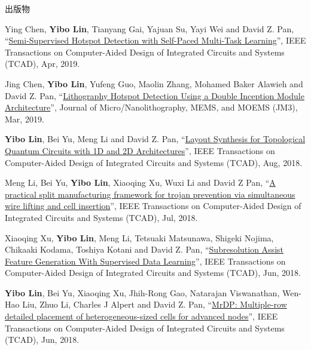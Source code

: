 \begin{rSection}{出版物}
\begin{description}[font=\normalfont, rightmargin=2em]
{}
            

\item[{[J14]}]{
        Ying Chen, \textbf{Yibo Lin}, Tianyang Gai, Yajuan Su, Yayi Wei and David Z. Pan, 
    ``\href{https://doi.org/10.1109/TCAD.2019.2912948}{Semi-Supervised Hotspot Detection with Self-Paced Multi-Task Learning}'', 
    IEEE Transactions on Computer-Aided Design of Integrated Circuits and Systems (TCAD), Apr, 2019.
    
}
            

\item[{[J13]}]{
        Jing Chen, \textbf{Yibo Lin}, Yufeng Guo, Maolin Zhang, Mohamed Baker Alawieh and David Z. Pan, 
    ``\href{https://doi.org/10.1117/1.JMM.18.1.013507}{Lithography Hotspot Detection Using a Double Inception Module Architecture}'', 
    Journal of Micro/Nanolithography, MEMS, and MOEMS (JM3), Mar, 2019.
    
}
            

\item[{[J12]}]{
        \textbf{Yibo Lin}, Bei Yu, Meng Li and David Z. Pan, 
    ``\href{https://doi.org/10.1109/TCAD.2017.2760511}{Layout Synthesis for Topological Quantum Circuits with 1D and 2D Architectures}'', 
    IEEE Transactions on Computer-Aided Design of Integrated Circuits and Systems (TCAD), Aug, 2018.
    
}
            

\item[{[J11]}]{
        Meng Li, Bei Yu, \textbf{Yibo Lin}, Xiaoqing Xu, Wuxi Li and David Z Pan, 
    ``\href{https://doi.org/10.1109/TCAD.2018.2859402}{A practical split manufacturing framework for trojan prevention via simultaneous wire lifting and cell insertion}'', 
    IEEE Transactions on Computer-Aided Design of Integrated Circuits and Systems (TCAD), Jul, 2018.
    
}
            

\item[{[J10]}]{
        Xiaoqing Xu, \textbf{Yibo Lin}, Meng Li, Tetsuaki Matsunawa, Shigeki Nojima, Chikaaki Kodama, Toshiya Kotani and David Z. Pan, 
    ``\href{https://doi.org/10.1109/TCAD.2017.2748029}{Subresolution Assist Feature Generation With Supervised Data Learning}'', 
    IEEE Transactions on Computer-Aided Design of Integrated Circuits and Systems (TCAD), Jun, 2018.
    
}
            

\item[{[J9]}]{
        \textbf{Yibo Lin}, Bei Yu, Xiaoqing Xu, Jhih-Rong Gao, Natarajan Viswanathan, Wen-Hao Liu, Zhuo Li, Charles J Alpert and David Z. Pan, 
    ``\href{https://doi.org/10.1109/TCAD.2017.2748025}{MrDP: Multiple-row detailed placement of heterogeneous-sized cells for advanced nodes}'', 
    IEEE Transactions on Computer-Aided Design of Integrated Circuits and Systems (TCAD), Jun, 2018.
    
}
\end{description}
\end{rSection}

